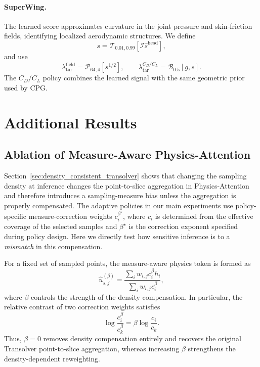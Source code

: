 \documentclass{article}
\begin{document}
\paragraph{SuperWing.}
The learned score approximates curvature in the joint pressure and
skin-friction fields, identifying localized aerodynamic structures. We define
\[
    s
    =\mathcal{T}_{0.01,0.99}
       [\mathcal{I}\widehat s^{\mathrm{head}}],
\]
and use
\begin{equation}
    \lambda_{\mathrm{tar}}^{\mathrm{field}}
    =\mathcal{P}_{64,4}[s^{1/2}],
    \qquad
    \lambda_{\mathrm{tar}}^{C_D/C_L}
    =\mathcal{B}_{0.5}[g,s].
    \label{eq:app_ca_superwing_density}
\end{equation}
The $C_D/C_L$ policy combines the learned signal with the same geometric prior
used by CPG.
\clearpage
\section{Additional Results}
\label{app:more_results}

\subsection{Ablation of Measure-Aware Physics-Attention}
\label{app:beta_ablation}

Section~\ref{sec:density_consistent_transolver} shows that changing the
sampling density at inference changes the point-to-slice aggregation in
Physics-Attention and therefore introduces a sampling-measure bias unless
the aggregation is properly compensated. The adaptive policies in our main
experiments use policy-specific measure-correction weights $c_i^{\beta^\star}$,
where $c_i$ is determined from the effective coverage of the selected
samples and $\beta^\star$ is the correction exponent specified during
policy design. Here we directly test how sensitive inference is to a
\emph{mismatch} in this compensation.

For a fixed set of sampled points, the measure-aware physics token is
formed as
\begin{equation}
    \widehat{u}_{s,j}^{(\beta)}
    =
    \frac{
        \sum_i w_{i,j} c_i^\beta h_i
    }{
        \sum_i w_{i,j} c_i^\beta
    },
    \label{eq:beta_token}
\end{equation}
where $\beta$ controls the strength of the density compensation.
In particular, the relative contrast of two correction weights satisfies
\begin{equation}
    \log
    \frac{c_i^\beta}{c_k^\beta}
    =
    \beta
    \log
    \frac{c_i}{c_k}.
    \label{eq:beta_weight_contrast}
\end{equation}
Thus, $\beta=0$ removes density compensation entirely and recovers the
original Transolver point-to-slice aggregation, whereas increasing
$\beta$ strengthens the density-dependent reweighting.
\end{document}
